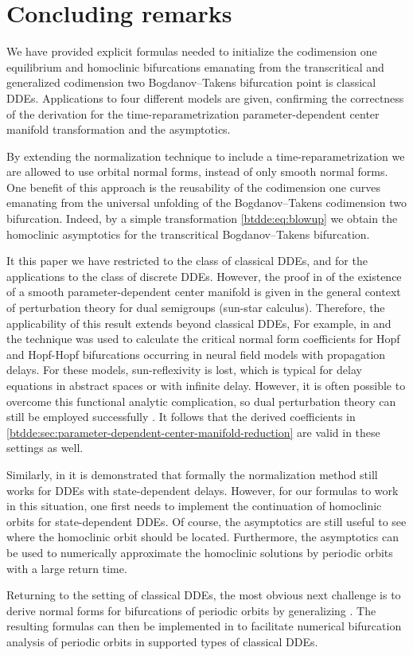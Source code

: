 \section{Concluding remarks}
We have provided explicit formulas needed to initialize the codimension one
equilibrium and homoclinic bifurcations emanating from the transcritical and
generalized codimension two Bogdanov--Takens bifurcation point is classical
DDEs. Applications to four different models are given, confirming the
correctness of the derivation for the time-reparametrization
parameter-dependent
center manifold transformation and the asymptotics.

By extending the normalization technique to include a time-reparametrization we
are allowed to use orbital normal forms, instead of only smooth normal forms.
One benefit of this approach is the reusability of the codimension one curves
emanating from the universal unfolding of the Bogdanov--Takens codimension two
bifurcation. Indeed, by a simple transformation \cref{btdde:eq:blowup} we obtain the
homoclinic asymptotics for the transcritical Bogdanov--Takens bifurcation.

It this paper we have restricted to the class of classical DDEs, and for the
applications to the class of discrete DDEs. However, the proof in
\cite{Switching2019} of the existence of a smooth parameter-dependent center
manifold is given in the general context of perturbation theory for dual
semigroups (sun-star calculus). Therefore, the applicability of this result
extends beyond classical DDEs, For example, in \cite{VanGils2013} and
\cite{Dijkstra2015} the technique was used to calculate the critical normal
form coefficients for Hopf and Hopf-Hopf bifurcations occurring in neural field
models with propagation delays. For these models, sun-reflexivity is lost, which
is typical for delay equations in abstract spaces or with infinite delay.
However, it is often possible to overcome this functional analytic
complication, so dual perturbation theory can still be employed successfully
\cite{Diekmann2008,Diekmann2012blending,VanGils2013,Janssens2019}. It follows
that the derived coefficients in
\cref{btdde:sec:parameter-dependent-center-manifold-reduction} are valid in these
settings as well.

Similarly, in \cite{Sieber@2017} it is demonstrated that formally the
normalization method still works for DDEs with state-dependent delays.
However, for our formulas to work in this situation, one first needs
to implement the continuation of homoclinic orbits for state-dependent
DDEs. Of course, the asymptotics are still useful to see where     the 
homoclinic orbit should be located. Furthermore, the asymptotics
can be used to numerically approximate the homoclinic solutions by periodic
orbits with a large return time.

Returning to the setting of classical DDEs, the most obvious next challenge is
to derive normal forms for bifurcations of periodic orbits by generalizing
\cite{Kuznetsov2005,DeWitte2013,DeWitte2014}. The resulting formulas can then
be implemented in \DDEBIFTOOL to facilitate numerical bifurcation analysis of
periodic orbits in supported types of classical DDEs.
